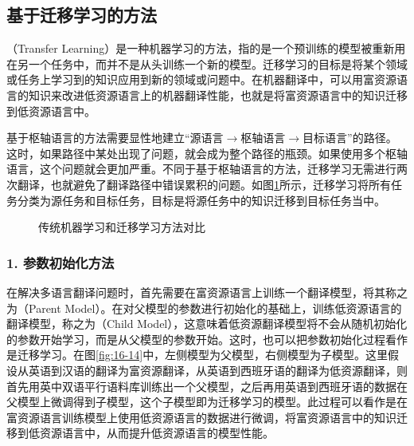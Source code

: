 \subsection{基于迁移学习的方法}

（Transfer Learning）是一种机器学习的方法，指的是一个预训练的模型被重新用在另一个任务中，而并不是从头训练一个新的模型。迁移学习的目标是将某个领域或任务上学习到的知识应用到新的领域或问题中。在机器翻译中，可以用富资源语言的知识来改进低资源语言上的机器翻译性能，也就是将富资源语言中的知识迁移到低资源语言中。

\parinterval 基于枢轴语言的方法需要显性地建立“源语言$\to$枢轴语言$\to$目标语言”的路径。这时，如果路径中某处出现了问题，就会成为整个路径的瓶颈。如果使用多个枢轴语言，这个问题就会更加严重。不同于基于枢轴语言的方法，迁移学习无需进行两次翻译，也就避免了翻译路径中错误累积的问题。如图\ref{fig:16-13}所示，迁移学习将所有任务分类为源任务和目标任务，目标是将源任务中的知识迁移到目标任务当中。
\begin{figure}[h]
\centering

\caption{传统机器学习和迁移学习方法对比}
\label{fig:16-13}
\end{figure}

\subsubsection{1. 参数初始化方法}

\parinterval 在解决多语言翻译问题时，首先需要在富资源语言上训练一个翻译模型，将其称之为{\small{}}（Parent Model）。在对父模型的参数进行初始化的基础上，训练低资源语言的翻译模型，称之为{\small{}}（Child Model），这意味着低资源翻译模型将不会从随机初始化的参数开始学习，而是从父模型的参数开始。这时，也可以把参数初始化过程看作是迁移学习。在图\ref{fig:16-14}中，左侧模型为父模型，右侧模型为子模型。这里假设从英语到汉语的翻译为富资源翻译，从英语到西班牙语的翻译为低资源翻译，则首先用英中双语平行语料库训练出一个父模型，之后再用英语到西班牙语的数据在父模型上微调得到子模型，这个子模型即为迁移学习的模型。此过程可以看作是在富资源语言训练模型上使用低资源语言的数据进行微调，将富资源语言中的知识迁移到低资源语言中，从而提升低资源语言的模型性能。

